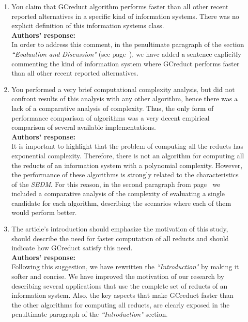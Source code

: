 \documentclass{letter}
\begin{document}
\begin{letter}{}
\begin{enumerate}
	\item You claim that GCreduct algorithm performs faster than all other recent reported alternatives in a specific kind of information systems. There was no explicit definition of this information systems class.\\
	\textbf{Authors’ response:}\\
	In order to address this comment, in the penultimate paragraph of the section \textit{``Evaluation and Discussion"}	(see page~\pageref{par:kind}), we have added a sentence explicitly commenting the kind of information system where GCreduct  performs faster than all other recent reported alternatives.

	\item You performed a very brief computational complexity analysis, but did not confront results of this analysis with any other algorithm, hence there was a lack of a comparative analysis of complexity. Thus, the only form of performance comparison of algorithms was a very decent empirical comparison of several available implementations.\\
	\textbf{Authors’ response:} \\
	It is important to highlight that the problem of computing all the reducts has exponential complexity. Therefore, there is not an algorithm for computing all the reducts of an information system with a polynomial complexity. However, the performance of these algorithms is strongly related to the characteristics of the \textit{SBDM}. For this reason, in the second paragraph from page~\pageref{par:complexity} we included a comparative analysis of the complexity of evaluating a single candidate for each algorithm, describing the scenarios where each of them would perform better.
	
	\item The article's introduction should emphasize the motivation of this study, should describe the need for faster computation of all reducts and should indicate how GCreduct satisfy this need.\\
	\textbf{Authors’ response:} \\
	Following this suggestion, we have rewritten the \textit{``Introduction"} by making it softer and concise. We have improved the motivation of our research by describing several applications that use the complete set of reducts of an information system. Also, the key aspects that make GCreduct faster than the other algorithms for computing all reducts, are clearly exposed in the penultimate paragraph of the \textit{``Introduction"} section.
	

\end{enumerate}
\end{letter}
\end{document}
